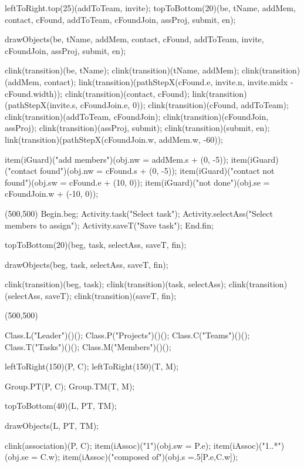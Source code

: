 \begin{empfile}
\begin{empdef}[activityR2]
leftToRight.top(25)(addToTeam, invite);
topToBottom(20)(be, tName, addMem, contact, cFound, addToTeam, cFoundJoin, assProj, submit, en);

drawObjects(be, tName, addMem, contact, cFound, addToTeam, invite, cFoundJoin, assProj, submit, en);

clink(transition)(be, tName);
clink(transition)(tName, addMem);
clink(transition)(addMem, contact);
link(transition)(pathStepX(cFound.e, invite.n, invite.midx - cFound.width));
clink(transition)(contact, cFound);
link(transition)(pathStepX(invite.s, cFoundJoin.e, 0));
clink(transition)(cFound, addToTeam);
clink(transition)(addToTeam, cFoundJoin);
clink(transition)(cFoundJoin, assProj);
clink(transition)(assProj, submit); 
clink(transition)(submit, en);
link(transition)(pathStepX(cFoundJoin.w, addMem.w, -60));

item(iGuard)("add members")(obj.nw = addMem.s + (0, -5));
item(iGuard)("contact found")(obj.nw = cFound.s + (0, -5));
item(iGuard)("contact not found")(obj.sw = cFound.e + (10, 0));
item(iGuard)("not done")(obj.se = cFoundJoin.w + (-10, 0));
\end{empdef}

\begin{empdef}[activityR4](500,500)
Begin.beg;
Activity.task("Select task");
Activity.selectAss("Select members to assign");
Activity.saveT("Save task");
End.fin;

topToBottom(20)(beg, task, selectAss, saveT, fin);

drawObjects(beg, task, selectAss, saveT, fin);

clink(transition)(beg, task);
clink(transition)(task, selectAss);
clink(transition)(selectAss, saveT);
clink(transition)(saveT, fin);
\end{empdef}

\begin{empdef}[erdiag](500,500)

Class.L("Leader")()();
Class.P("Projects")()();
Class.C("Teams")()();
Class.T("Tasks")()();
Class.M("Members")()();

leftToRight(150)(P, C);
leftToRight(150)(T, M);

Group.PT(P, C);
Group.TM(T, M);

topToBottom(40)(L, PT, TM);



drawObjects(L, PT, TM);

clink(association)(P, C);
item(iAssoc)("1")(obj.sw = P.e);
item(iAssoc)("1..*")(obj.se = C.w);
item(iAssoc)("composed of")(obj.s =.5[P.e,C.w]);


\end{empdef}
\end{empfile}

